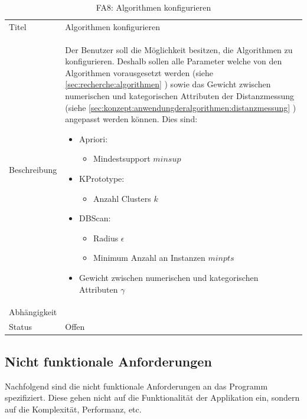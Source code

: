 \begin{table}[H] 
	\caption{FA8: Algorithmen konfigurieren}
	\centering
	\label{fig:anforderungsanalyse:funktionaleanforderung:fa8}
	\begin{tabular}{ | l | L{10cm} | } 
		\hline 
		 \\ \hline 
		Titel & Algorithmen konfigurieren \\ \hline 
		Beschreibung & Der Benutzer soll die Möglichkeit besitzen, die Algorithmen zu konfigurieren. Deshalb sollen alle Parameter welche von den Algorithmen vorausgesetzt werden (siehe \cref{sec:recherche:algorithmen} ) sowie das Gewicht zwischen numerischen und kategorischen Attributen der Distanzmessung (siehe \cref{sec:konzept:anwendungderalgorithmen:distanzmessung} ) angepasst werden können.
		Dies sind: 
		\begin{itemize}
			\item Apriori:
			\begin{itemize}
				\item Mindestsupport $minsup$
			\end{itemize}
			\item KPrototype:
			\begin{itemize}
				\item Anzahl Clusters $k$
			\end{itemize}
			\item DBScan:
			\begin{itemize}
				\item Radius $\epsilon$
				\item Minimum Anzahl an Instanzen $minpts$
			\end{itemize}
			\item Gewicht zwischen numerischen und kategorischen Attributen $\gamma$
		\end{itemize}
		 \\ \hline 
		Abhängigkeit & \\ \hline 
		Status & Offen \\ \hline 
	\end{tabular}
\end{table}


\subsection{Nicht funktionale Anforderungen}
\label{sec:anforderungsanalyse:nichtfunktionaleanforderung}
Nachfolgend sind die nicht funktionale Anforderungen an das Programm spezifiziert. Diese gehen nicht auf die Funktionalität der Applikation ein, sondern auf die Komplexität, Performanz, etc.

